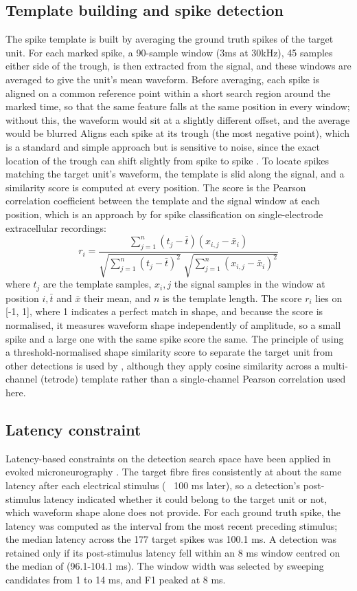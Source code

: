 \documentclass[ %
                    author={Daniel Page},
                supervisor={Dr. Andrew Calway},
                    degree={MSc},
                     title={Some Structural Guidelines for Data Science MSc Theses, Including Those With Long Titles that Run Across Multiple Lines on the Front Page},
                  subtitle={And those including an optional subtitle too, for good measure},
                      type={},
                      year={2021}]{dissertation}
\begin{document}
\subsection{Template building and spike detection}
The spike template is built by averaging the ground truth spikes of the target unit. For each marked spike, a 90-sample window (3ms at 30kHz), 45 samples either side of the trough, is then extracted from the signal, and these windows are averaged to give the unit's mean waveform. Before averaging, each spike is aligned on a common reference point within a short search region around the marked time, so that the same feature falls at the same position in every window; without this, the waveform would sit at a slightly different offset, and the average would be blurred
Aligns each spike at its trough (the most negative point), which is a standard and simple approach but is sensitive to noise, since the exact location of the trough can shift slightly from spike to spike \cite{lee_non-linear_2021}. 
To locate spikes matching the target unit's waveform, the template is slid along the signal, and a similarity score is computed at every position. The score is the Pearson correlation coefficient between the template and the signal window at each position, which is an approach by \cite{park_deep_2019} for spike classification on single-electrode extracellular recordings:
\begin{equation}
    r_i = \frac{\sum_{j=1}^{n} (t_j - \bar{t})(x_{i,j} - \bar{x}_i)}
    {\sqrt{\sum_{j=1}^{n} (t_j-\bar{t})^2}\;\sqrt{\sum_{j=1}^{n} (x_{i,j} - \bar{x}_i)^2}}
\end{equation}
where \(t_j\) are the template samples, \(x_i,j\) the signal samples in the window at position \(i,\bar{t}\) and \(\bar{x}\) their mean, and \(n\) is the template length. The score \(r_i\) lies on [-1, 1], where 1 indicates a perfect match in shape, and because the score is normalised, it measures waveform shape independently of amplitude, so a small spike and a large one with the same spike score the same. The principle of using a threshold-normalised shape similarity score to separate the target unit from other detections is used by \cite{laboy-juarez_normalized_2019}, although they apply cosine similarity across a multi-channel (tetrode) template rather than a single-channel Pearson correlation used here. 
 
\subsection{Latency constraint}
Latency-based constraints on the detection search space have been applied in evoked microneurography \cite{troglio_hybrid_2026}. The target fibre fires consistently at about the same latency after each electrical stimulus (~ 100 ms later), so a detection's post-stimulus latency indicated whether it could belong to the target unit or not, which waveform shape alone does not provide. For each ground truth spike, the latency was computed as the interval from the most recent preceding stimulus; the median latency across the 177 target spikes was 100.1 ms. A detection was retained only if its post-stimulus latency fell within an 8 ms window centred on the median of  (96.1-104.1 ms). The window width was selected by sweeping candidates from 1 to 14 ms, and F1 peaked at 8 ms. 
\end{document}
